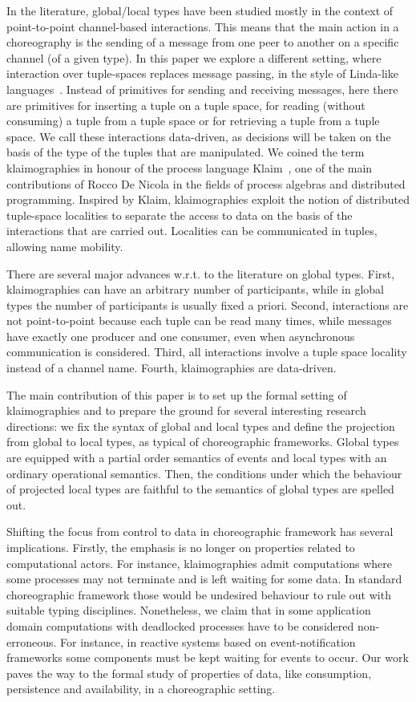 In the literature, global/local types have been studied mostly in the
context of point-to-point channel-based interactions. This means that
the main action in a choreography is the sending of a message from one
peer to another on a specific channel (of a given type). In this paper we
explore a different setting, where interaction over tuple-spaces
replaces message passing, in the style of Linda-like
languages~\cite{DBLP:journals/toplas/Gelernter85}.  Instead of
primitives for sending and receiving messages, here there are
primitives for inserting a tuple on a tuple space, for reading
(without consuming) a tuple from a tuple space or for retrieving a
tuple from a tuple space. We call these interactions data-driven, as
decisions will be taken on the basis of the type of the tuples that
are manipulated. We coined the term klaimographies in honour of the
process language Klaim~\cite{DBLP:journals/tse/NicolaFP98,klaim}, one
of the main contributions of Rocco De Nicola in the fields of process
algebras and distributed programming. Inspired by Klaim,
klaimographies exploit the notion of distributed tuple-space
localities to separate the access to data on the basis of the
interactions that are carried out. Localities can be communicated in
tuples, allowing name mobility.

There are several major advances w.r.t. to the literature on global types.
First, klaimographies can have an arbitrary number of participants, while in global types the number of participants is usually fixed a priori.
Second, interactions are not point-to-point because each tuple can be read many times, while messages have exactly one producer and one consumer, even when asynchronous communication is considered.
Third, all interactions involve a tuple space locality instead of a channel name.
Fourth, klaimographies are data-driven.

The main contribution of this paper is to set up the formal setting of klaimographies and to prepare the ground for several interesting research directions: we fix the syntax of global and local types and define the projection from global to local types, as typical of choreographic frameworks.
Global types are equipped with a partial order semantics of events and local types with an ordinary operational semantics. Then, the conditions under which the behaviour of projected local types are faithful to the semantics of global types are spelled out. 

Shifting the focus from control to data in choreographic framework has
several implications.
%
Firstly, the emphasis is no longer on properties related to
computational actors.
%
For instance, klaimographies admit computations where some processes
may not terminate and is left waiting for some data.
%
In standard choreographic framework those would be undesired behaviour
to rule out with suitable typing disciplines.
%
Nonetheless, we claim that in some application domain computations with
deadlocked processes have to be considered non-erroneous.
%
For instance, in reactive systems based on event-notification
frameworks some  components must be kept waiting for
events to occur.
%
Our work paves the way to the formal study of properties of data, like consumption, persistence and availability, in a choreographic setting.

